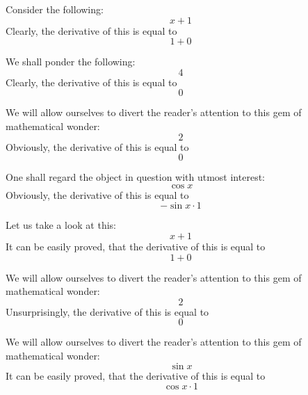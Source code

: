\documentclass{article}
\begin{document}
Consider the following:
\begin{equation}
x + 1 
\end{equation}
Clearly, the derivative of this is equal to
\begin{equation}
1 + 0 
\end{equation}

We shall ponder the following:
\begin{equation}
4 
\end{equation}
Clearly, the derivative of this is equal to
\begin{equation}
0 
\end{equation}

We will allow ourselves to divert the reader's attention to this gem of mathematical wonder:
\begin{equation}
2 
\end{equation}
Obviously, the derivative of this is equal to
\begin{equation}
0 
\end{equation}

One shall regard the object in question with utmost interest:
\begin{equation}
\cos x 
\end{equation}
Obviously, the derivative of this is equal to
\begin{equation}
-\sin x \cdot 1 
\end{equation}

Let us take a look at this:
\begin{equation}
x + 1 
\end{equation}
It can be easily proved, that the derivative of this is equal to
\begin{equation}
1 + 0 
\end{equation}

We will allow ourselves to divert the reader's attention to this gem of mathematical wonder:
\begin{equation}
2 
\end{equation}
Unsurprisingly, the derivative of this is equal to
\begin{equation}
0 
\end{equation}

We will allow ourselves to divert the reader's attention to this gem of mathematical wonder:
\begin{equation}
\sin x 
\end{equation}
It can be easily proved, that the derivative of this is equal to
\begin{equation}
\cos x \cdot 1 
\end{equation}
\end{document}
